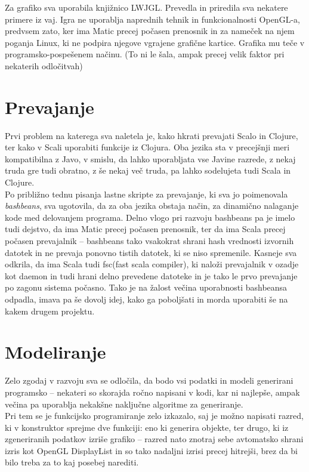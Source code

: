 \documentclass[10pt,a4paper,oneside]{book}
\begin{document}
Za grafiko sva uporabila knjižnico LWJGL. Prevedla in priredila sva
nekatere primere iz vaj. Igra ne uporablja naprednih tehnik in
funkcionalnosti OpenGL-a, predvsem zato, ker ima Matic precej počasen
prenosnik in za nameček na njem poganja Linux, ki ne podpira njegove
vgrajene grafične kartice. Grafika mu teče v programsko-pospešenem
načinu. (To ni le šala, ampak precej velik faktor pri nekaterih
odločitvah)

\section{Prevajanje}
Prvi problem na katerega sva naletela je, kako hkrati prevajati Scalo in Clojure, ter kako v Scali uporabiti funkcije iz Clojura. Oba jezika sta v precejšnji meri kompatibilna z Javo, v smislu, da lahko uporabljata vse Javine razrede, z nekaj truda gre tudi obratno, z še nekaj več truda, pa lahko sodelujeta tudi Scala in Clojure.\\[-7pt]

Po približno tednu pisanja lastne skripte za prevajanje, ki sva jo poimenovala \textit{bashbeans}, sva ugotovila, da za oba jezika obstaja način, za dinamično nalaganje kode med delovanjem programa. Delno vlogo pri razvoju bashbeans pa je imelo tudi dejstvo, da ima Matic precej počasen prenosnik, ter da ima Scala precej počasen prevajalnik -- bashbeans tako vsakokrat shrani hash vrednosti izvornih datotek in ne prevaja ponovno tistih datotek, ki se niso spremenile. Kasneje sva odkrila, da ima Scala tudi fsc(fast scala compiler), ki naloži prevajalnik v ozadje kot daemon in tudi hrani delno prevedene datoteke in je tako le prvo prevajanje po zagonu sistema počasno. Tako je na žalost večina uporabnosti bashbeansa odpadla, imava pa še dovolj idej, kako ga poboljšati in morda uporabiti še na kakem drugem projektu.

\section{Modeliranje}
Zelo zgodaj v razvoju sva se odločila, da bodo vsi podatki in modeli generirani programsko -- nekateri so skorajda ročno napisani v kodi, kar ni najlepše, ampak večina pa uporablja nekakšne naključne algoritme za generiranje.\\[-7pt]

Pri tem se je funkcijsko programiranje zelo izkazalo, saj je možno napisati razred, ki v konstruktor sprejme dve funkciji: eno ki generira objekte, ter drugo, ki iz zgeneriranih podatkov izriše grafiko -- razred nato znotraj sebe avtomatsko shrani izris kot OpenGL DisplayList in so tako nadaljni izrisi precej hitrejši, brez da bi bilo treba za to kaj posebej narediti.\\[-7pt]
\end{document}
